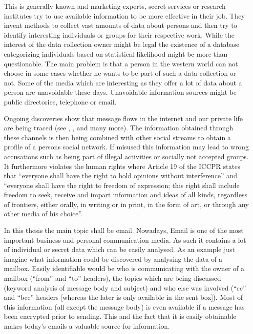 \documentclass[twocolumn,a4paper,10pt,english]{scrartcl}
\begin{document}
This is generally known and marketing experts, secret services or research institutes try to use available information to be more effective in their job. They invent methods to collect vast amounts of data about persons and then try to identify interesting individuals or groups for their respective work. While the interest of the data collection owner might be legal the existence of a database categorizing individuals based on statistical likelihood might be more than questionable. The main problem is that a person in the western world can not choose in some cases whether he wants to be part of such a data collection or not. Some of the media which are interesting as they offer a lot of data about a person are unavoidable these days. Unavoidable information sources might be public directories, telephone or email.\par

Ongoing discoveries show that message flows in the internet and our private life are being traced (see \cite{ECHELON}, \cite{wiki:prism}, \cite{wiki:tempora} and many more). The information obtained through these channels is then being combined with other social streams to obtain a profile of a persons social network. If misused this information may lead to wrong accusations such as being part of illegal activities or socially not accepted groups. It furthermore violates the human rights where Article 19 of the ICCPR states that ``everyone shall have the right to hold opinions without interference'' and ``everyone shall have the right to freedom of expression; this right shall include freedom to seek, receive and impart information and ideas of all kinds, regardless of frontiers, either orally, in writing or in print, in the form of art, or through any other media of his choice''\cite{iccpr}.\par

In this thesis the main topic shall be email. Nowadays, Email is one of the most important business and personal communication media. As such it contains a lot of individual or secret data which can be easily analysed. As an example just imagine what information could be discovered by analysing the data of a mailbox. Easily identifiable would be who is communicating with the owner of a mailbox (``from'' and ``to'' headers), the topics which are being discussed (keyword analysis of message body and subject) and who else was involved (``cc'' and ``bcc'' headers [whereas the later is only available in the sent box]). Most of this information (all except the message body) is even available if a message has been encrypted prior to sending. This and the fact that it is easily obtainable makes today’s emails a valuable source for information.\par
\end{document}
